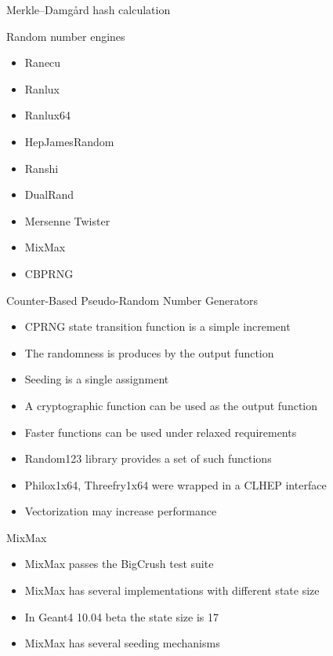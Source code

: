 \documentclass[aspectratio=169, 14pt]{beamer}
\begin{document}
\begin{large}
 \begin{frame}{Merkle–Damgård hash calculation}
  \begin{figure}
   \scalebox{.5}{}
  \end{figure}
 \end{frame}

 \begin{frame}{Random number engines}
   \begin{multicols}{2}
   \begin{itemize}
    \item Ranecu
    \item Ranlux
    \item Ranlux64
    \item HepJamesRandom
    \item Ranshi
    \item DualRand
    \item Mersenne Twister
    \item MixMax
    \item CBPRNG
   \end{itemize}
  \end{multicols}
 \end{frame}
%  
 \begin{frame}{Counter-Based Pseudo-Random Number Generators}
  \begin{itemize}
   \item CPRNG state transition function is a simple increment
   \item The randomness is produces by the output function
   \item Seeding is a single assignment
   \item A cryptographic function can be used as the output function
   \item Faster functions can be used under relaxed requirements
   \item Random123 library provides a set of such functions
   \item Philox1x64, Threefry1x64 were wrapped in a CLHEP interface
   \item Vectorization may increase performance
  \end{itemize}
 \end{frame} 
 
 \begin{frame}{MixMax}
  \begin{itemize}
   \item MixMax passes the BigCrush test suite
   \item MixMax has several implementations with different state size
   \item In Geant4 10.04 beta the state size is 17
   \item MixMax has several seeding mechanisms
  \end{itemize}
 \end{frame}
 

\end{large}
\end{document}
